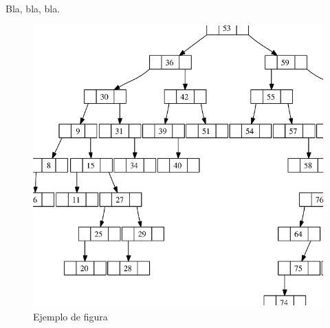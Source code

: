 \begin{large}
Bla, bla, bla.
\end{large}

\newpage

\begin{figure}[htb]
   \centering
   \includegraphics[width=0.8\linewidth]{images/figura_1}
   \caption{Ejemplo de figura}
   \label{chapter:intro}
\end{figure}